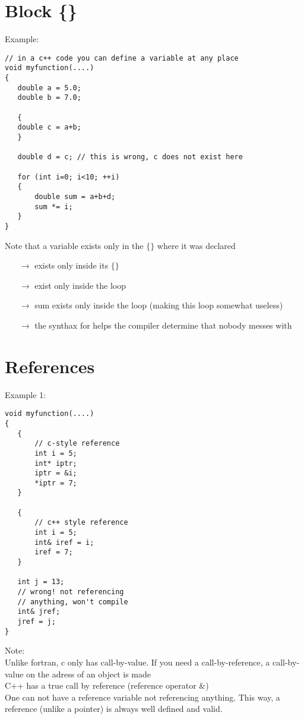 \section{Block \{\}}
Example:\\
\begin{boxedminipage}{\linewidth}
\begin{verbatim}
// in a c++ code you can define a variable at any place
void myfunction(....)
{
   double a = 5.0;
   double b = 7.0;
   
   {
   double c = a+b;
   }

   double d = c; // this is wrong, c does not exist here

   for (int i=0; i<10; ++i)
   {       
       double sum = a+b+d;
       sum *= i;
   }       
}
\end{verbatim}
\end{boxedminipage}
Note that a variable exists only in the $\{\}$ where it was declared
\begin{itemize}
\item[$\to$]  exists only inside its $\{\}$
\item[$\to$]  exist only inside the loop
\item[$\to$] sum exists only inside the loop (making this loop somewhat useless)
\item[$\to$] the synthax for  helps the compiler determine that nobody messes with 
\end{itemize}

\section{References}
Example 1:\\
\begin{minipage}{0.45\linewidth}
\begin{boxedminipage}{\linewidth}
\begin{verbatim}
void myfunction(....)
{
   {
       // c-style reference
       int i = 5;
       int* iptr;
       iptr = &i;
       *iptr = 7;
   }

   {
       // c++ style reference
       int i = 5;
       int& iref = i;
       iref = 7;
   }

   int j = 13;
   // wrong! not referencing
   // anything, won't compile
   int& jref;
   jref = j;
}
\end{verbatim}
\end{boxedminipage}
\end{minipage}
\hfill
\begin{minipage}{0.45\linewidth}
Note:\\
Unlike fortran, c only has
call-by-value. If you need a
call-by-reference,
a call-by-value on the
adress of an object is made
\\[1.5cm]

C++ has a true call by reference
(reference operator \&)
\\[1.5cm]

One can not have a reference variable
not referencing anything. This way, a
reference (unlike a pointer) is always
well defined and valid.
\end{minipage}

